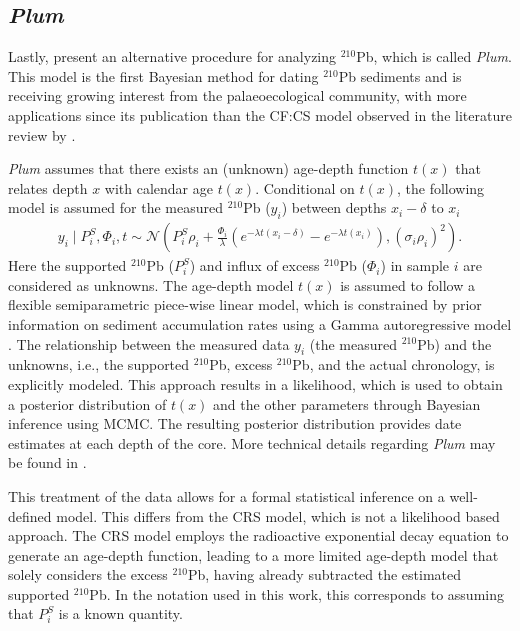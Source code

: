 \documentclass [10pt] {article}
\newcommand{\ac}{\color{red} }  %
\newcommand{\ca}{\color{black}} %
\begin{document}


\subsection{\textit{Plum}}

Lastly, \citet{Aquino2018} present an alternative procedure for analyzing  $^{210}$Pb, which is called \textit{Plum}.
This model is the first Bayesian method for dating $^{210}$Pb sediments and is receiving growing interest from the palaeoecological community, with more applications since its publication than the CF:CS model observed in the literature review by \citet{Courtney2019}.

\textit{Plum} assumes that there exists an (unknown) age-depth function $t(x)$ that relates depth $x$ with calendar age $t(x)$. 
Conditional on $t(x)$, the following model is assumed for the measured $^{210}$Pb ($y_i$) between depths $x_i - \delta$ to $x_i$
\begin{eqnarray}
y_i \mid P^S_i, \Phi_i, t \sim \mathcal{N} \left(P^S_i \rho_i +\frac{\Phi_i}{\lambda} \left( e^{-\lambda t(x_i-\delta)} - e^{-\lambda t(x_i)} \right), (\sigma_i\rho_i)^2 \right). 
\end{eqnarray}
Here the supported $^{210}$Pb ($P_i^S$) and influx of excess $^{210}$Pb ($\Phi_i$) in sample $i$ are considered as unknowns. The age-depth model $t(x)$ is assumed to follow a flexible semiparametric piece-wise linear model, which is constrained by prior information on sediment accumulation rates using a Gamma autoregressive model \citep{Blaauw2011}. The relationship between the measured data $y_i$ (the measured $^{210}$Pb) and the unknowns, i.e., the supported $^{210}$Pb, excess $^{210}$Pb, and the actual chronology, is explicitly modeled. This approach results in a likelihood, which is used to obtain a posterior distribution of $t(x)$ and the other parameters through Bayesian inference using MCMC. The resulting posterior distribution provides date estimates at each depth of the core. More technical details regarding \textit{Plum} may be found in \citep{Aquino2018}.

This treatment of the data allows for a formal statistical inference on a well-defined model. This differs from the CRS model, which is not a likelihood based approach. The CRS model employs the radioactive exponential decay equation to generate an age-depth function, leading to a more limited age-depth model that solely considers the excess $^{210}$Pb, having already subtracted the estimated supported $^{210}$Pb. In the notation used in this work, this corresponds to assuming that $P^S_i$ is a known quantity.
\end{document}
